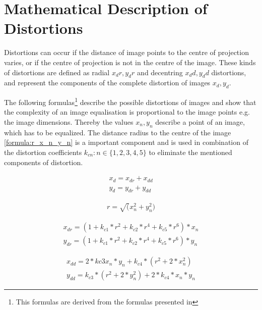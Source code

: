 \chapter{Mathematical Description of Distortions}
\label{mt:c:Appendix:Mathematical_description_of_distortions}
Distortions can occur if the distance of image points to the centre of projection
varies, or if the centre of projection is not in the centre of the image. These
kinds of distortions are defined as radial \ensuremath{x_dr, y_dr} and decentring
\ensuremath{x_dd, y_dd} distortions, and represent the components of the complete
distortion of images \ensuremath{x_d, y_d}.

The following formulas\footnote{This formulas are derived from the formulas
presented in }
describe the possible distortions of images and show that the complexity of an
image equalisation is proportional to the image points e.g. the image dimensions.
Thereby the values \ensuremath{x_n, y_n} describe a point of an image, which has
to be equalized. The distance radius to the centre of the image
\ref{formula:r_x_n_y_n} is a important component and is used in combination of
the distortion coefficients \ensuremath{ k_{cn} : n \in \{1, 2, 3,
4, 5 \}} to eliminate the mentioned components of distortion.


\begin{equation}
\label{formula:x_d_y_d}
\begin{array}{l}
x_d = x_{dr} + x_{dd} \\
y_d = y_{dr} + y_{dd}
\end{array}
\end{equation}

\begin{equation}
\label{formula:r_x_n_y_n}
\begin{array}{l}
r = \sqrt(x_n^2+y_n^2)
\end{array}
\end{equation}

\begin{equation}
\label{formula:x_dr_y_dr}
\begin{array}{l}
x_{dr} = (1+k_{c1}*r^2+k_{c2}*r^4+k_{c5}*r^6)*x_n\\
y_{dr} = (1+k_{c1}*r^2+k_{c2}*r^4+k_{c5}*r^6)*y_n
\end{array}
\end{equation}

\begin{equation}
\label{formula:x_dd_y_dd}
\begin{array}{l}
x_{dd} = 2*k{c3}x_n*y_n+k_{c4}*(r^2+2*x_{n}^2)\\
y_{dd} = k_{c3}*(r^2+2*y_{n}^2)+2*k_{c4}*x_{n}*y_{n}
\end{array}
\end{equation}


